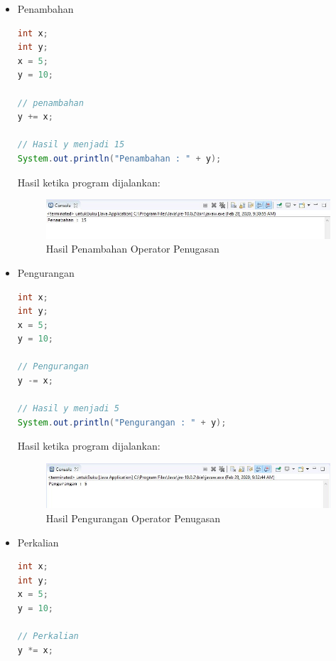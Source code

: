 \begin{enumerate}
\begin{itemize}
        \item Penambahan
        \begin{lstlisting}[language=Java]
int x;
int y;
x = 5;
y = 10;

// penambahan
y += x;

// Hasil y menjadi 15
System.out.println("Penambahan : " + y);
        \end{lstlisting}
        Hasil ketika program dijalankan:
        \begin{figure}[htbp!]
            \centering
            \includegraphics[scale=0.6]{pictures/penambahan_operator_penugasan.JPG}
            \caption{Hasil Penambahan Operator Penugasan}
            \label{}
        \end{figure}

        \item Pengurangan
        \begin{lstlisting}[language=Java]
int x;
int y;
x = 5;
y = 10;

// Pengurangan 
y -= x;

// Hasil y menjadi 5
System.out.println("Pengurangan : " + y);
        \end{lstlisting}
        Hasil ketika program dijalankan:
        \begin{figure}[htbp!]
            \centering
            \includegraphics[scale=0.6]{pictures/pengurangan_operator_penugasan.JPG}
            \caption{Hasil Pengurangan Operator Penugasan}
            \label{}
        \end{figure}

        \item Perkalian
        \begin{lstlisting}[language=Java]
int x;
int y;
x = 5;
y = 10;

// Perkalian 
y *= x;


\end{lstlisting}
\end{itemize}
\end{enumerate}
